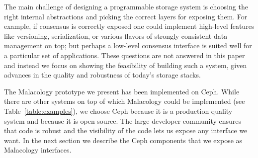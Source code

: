 The main challenge of designing a programmable storage system is choosing the
right internal abstractions and picking the correct layers for exposing them.
   For example, if
consensus is correctly exposed one could implement high-level features like
versioning, serialization, or various flavors of strongly consistent data
management on top; but perhaps a low-level consensus interface is suited well
for a particular set of applications.  These questions are not answered in this
paper and instead we focus on showing the feasibility of building such a
system, given advances in the quality and robustness of today's storage stacks.

The Malacology prototype we present has been implemented on Ceph.  While there
are other systems on top of which Malacology could be implemented (see
Table~\ref{table:examples}), we choose Ceph because it is a production quality
system and because it is open source. The large developer community ensures
that code is robust and the visibility of the code lets us expose any interface
we want. In the next section we describe the Ceph components that we expose as
Malacology interfaces.
